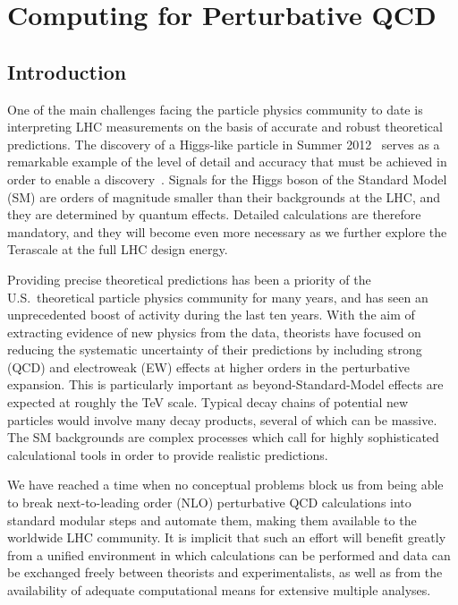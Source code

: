 \section{Computing for Perturbative QCD}
\label{chap:PQCD}
\subsection{Introduction}

One of the main challenges facing the particle physics community to date
is interpreting LHC measurements on the basis of accurate and
robust theoretical predictions.  The discovery of a Higgs-like
particle in Summer 2012~\cite{Aad:2012tfa,Chatrchyan:2012ufa} serves
as a remarkable example of the level of detail and accuracy that must
be achieved in order to enable a
discovery~\cite{Dittmaier:2011ti,Dittmaier:2012vm,Heinemeyer:2013tqa}.
Signals for the Higgs boson of the Standard Model (SM) are orders of 
magnitude smaller than their backgrounds at the LHC, and they are 
determined by quantum effects.  Detailed calculations are therefore 
mandatory, and they will become even more necessary as we further 
explore the Terascale at the full LHC design energy.

Providing precise theoretical predictions has been a priority of the U.S.\ 
theoretical particle physics community for many years, and has seen an
unprecedented boost of activity during the last ten years. With the
aim of extracting evidence of new physics from the data, theorists
have focused on reducing the systematic uncertainty of their predictions
by including strong (QCD) and electroweak (EW) effects at higher orders
in the perturbative expansion. This is particularly important as
beyond-Standard-Model effects are expected at roughly the TeV scale. 
Typical decay chains of potential new particles would involve many 
decay products, several of which can be massive. The SM backgrounds 
are complex processes which call for highly sophisticated calculational 
tools in order to provide realistic predictions.

We have reached a time when no conceptual problems block us
from being able to break next-to-leading order (NLO)
perturbative QCD calculations into standard modular steps and automate
them, making them available to the worldwide LHC community.  It is
implicit that such an effort will benefit greatly from a unified
environment in which calculations can be performed and data can be
exchanged freely between theorists and experimentalists,
as well as from the availability of adequate computational means
for extensive multiple analyses.

